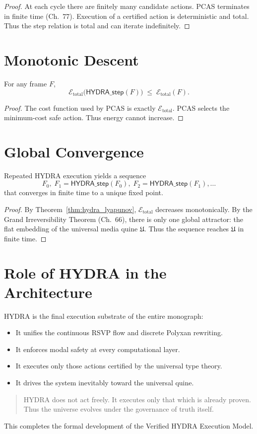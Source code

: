 \begin{proof}
At each cycle there are finitely many candidate actions.  
PCAS terminates in finite time (Ch.~77).  
Execution of a certified action is deterministic and total.  
Thus the step relation is total and can iterate indefinitely.
\end{proof}

\section{Monotonic Descent}

\begin{theorem}
\label{thm:hydra_lyapunov}
For any frame $F$,
\[
\mathcal{E}_{\mathrm{total}}
  \bigl(\mathsf{HYDRA\_step}(F)\bigr)
  \;\le\;
\mathcal{E}_{\mathrm{total}}(F).
\]
\end{theorem}

\begin{proof}
The cost function used by PCAS is exactly $\mathcal{E}_{\mathrm{total}}$.  
PCAS selects the minimum-cost safe action.  
Thus energy cannot increase.
\end{proof}

\section{Global Convergence}

\begin{theorem}
\label{thm:hydra_convergence}
Repeated HYDRA execution yields a sequence
\[
F_0,\; F_1=\mathsf{HYDRA\_step}(F_0),\;
F_2=\mathsf{HYDRA\_step}(F_1),\ldots
\]
that converges in finite time to a unique fixed point.
\end{theorem}

\begin{proof}
By Theorem~\ref{thm:hydra_lyapunov}, 
$\mathcal{E}_{\mathrm{total}}$ decreases monotonically.  
By the Grand Irreversibility Theorem (Ch.~66),  
there is only one global attractor:  
the flat embedding of the universal media quine $\mathfrak{U}$.  
Thus the sequence reaches $\mathfrak{U}$ in finite time.
\end{proof}

\section{Role of HYDRA in the Architecture}

HYDRA is the final execution substrate of the entire monograph:
\begin{itemize}
\item It unifies the continuous RSVP flow and discrete Polyxan rewriting.
\item It enforces modal safety at every computational layer.
\item It executes only those actions certified by the universal type theory.
\item It drives the system inevitably toward the universal quine.
\end{itemize}

\begin{quote}
HYDRA does not act freely.  
It executes only that which is already proven.  
Thus the universe evolves under the governance of truth itself.
\end{quote}

This completes the formal development of the Verified HYDRA Execution Model.

